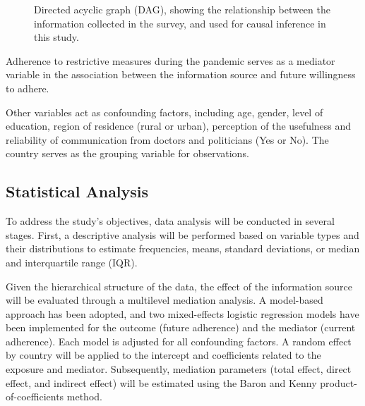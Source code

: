 \documentclass[11pt]{article} %
\begin{document}
\begin{figure} [ht!]
    \caption{\label{fig-DAG}Directed acyclic graph (DAG), showing the relationship between the information collected in the survey, and used for causal inference in this study.}
\end{figure}

Adherence to restrictive measures during the pandemic serves as a mediator variable in the association between the information source and future willingness to adhere. 

Other variables act as confounding factors, including age, gender, level of education, region of residence (rural or urban), perception of the usefulness and reliability of communication from doctors and politicians (Yes or No). The country serves as the grouping variable for observations.


\subsection*{Statistical Analysis}  
To address the study's objectives, data analysis will be conducted in several stages. First, a descriptive analysis will be performed based on variable types and their distributions to estimate frequencies, means, standard deviations, or median and interquartile range (IQR).

Given the hierarchical structure of the data, the effect of the information source will be evaluated through a multilevel mediation analysis. A model-based approach has been adopted, and two mixed-effects logistic regression models have been implemented for the outcome (future adherence) and the mediator (current adherence). Each model is adjusted for all confounding factors. A random effect by country will be applied to the intercept and coefficients related to the exposure and mediator. Subsequently, mediation parameters (total effect, direct effect, and indirect effect) will be estimated using the Baron and Kenny product-of-coefficients method.
\end{document}
